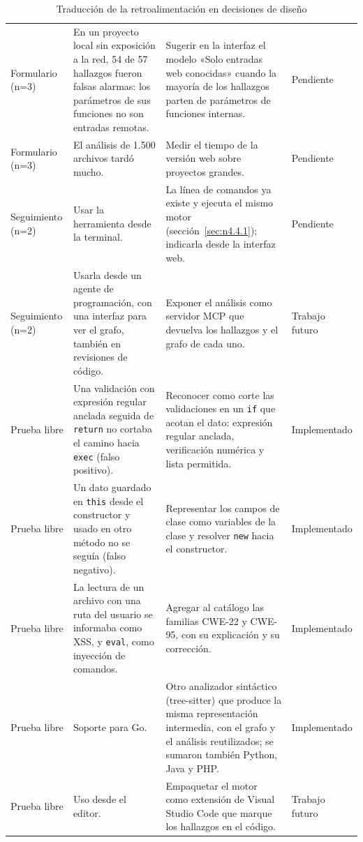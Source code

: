 \begin{table}[H]
    \centering
    \caption{Traducción de la retroalimentación en decisiones de diseño}
    \label{tab:feedback-decisiones}
    \small
    \begin{tabularx}{\textwidth}{l L L l}
        \toprule
         &  &  &  \\
        \midrule
        Formulario (n=3) & En un proyecto local sin exposición a la red, 54 de 57 hallazgos fueron falsas alarmas: los parámetros de sus funciones no son entradas remotas. & Sugerir en la interfaz el modelo «Solo entradas web conocidas» cuando la mayoría de los hallazgos parten de parámetros de funciones internas. & Pendiente \\
        Formulario (n=3) & El análisis de 1.500 archivos tardó mucho. & Medir el tiempo de la versión web sobre proyectos grandes. & Pendiente \\
        Seguimiento (n=2) & Usar la herramienta desde la terminal. & La línea de comandos ya existe y ejecuta el mismo motor (sección~\ref{sec:n4.4.1}); indicarla desde la interfaz web. & Pendiente \\
        Seguimiento (n=2) & Usarla desde un agente de programación, con una interfaz para ver el grafo, también en revisiones de código. & Exponer el análisis como servidor MCP que devuelva los hallazgos y el grafo de cada uno. & Trabajo futuro \\
        \midrule
        Prueba libre & Una validación con expresión regular anclada seguida
            de \texttt{return} no cortaba el camino hacia \texttt{exec}
            (falso positivo). & Reconocer como corte las validaciones en un
            \texttt{if} que acotan el dato: expresión regular anclada,
            verificación numérica y lista permitida. & Implementado \\
        Prueba libre & Un dato guardado en \texttt{this} desde el
            constructor y usado en otro método no se seguía (falso
            negativo). & Representar los campos de clase como variables
            de la clase y resolver \texttt{new} hacia el constructor. &
            Implementado \\
        Prueba libre & La lectura de un archivo con una ruta del usuario se
            informaba como XSS, y \texttt{eval}, como inyección de
            comandos. & Agregar al catálogo las familias CWE-22 y CWE-95,
            con su explicación y su corrección. & Implementado \\
        Prueba libre & Soporte para Go. & Otro analizador sintáctico
            (tree-sitter) que produce la misma representación intermedia,
            con el grafo y el análisis reutilizados; se sumaron también
            Python, Java y PHP. & Implementado \\
        Prueba libre & Uso desde el editor. & Empaquetar el motor como
            extensión de Visual Studio Code que marque los hallazgos en
            el código. & Trabajo futuro \\
        \bottomrule
    \end{tabularx}
\end{table}

